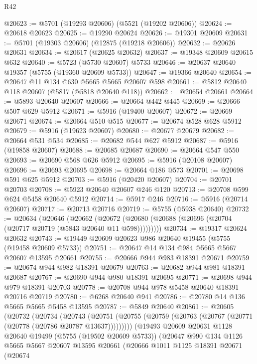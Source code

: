 \begin{lexlean}{R42}
\begin{coremodule}
@20623 := @5701 (@19293 @20606) (@5521 (@19202 @20606))
@20624 := @20618 @20623
@20625 := @19290 @20624
@20626 := @19301 @20609
@20631 := @5701 (@19303 @20606) (@12875 (@19218 @20606))
@20632 := @20626 @20631
@20634 := @20617 (@20625 @20632)
@20637 := @19348 @20609 @20615 @632
@20640 := @5723 (@5730 @20607) @5733
@20646 := @20637 @20640 @19357 (@5755 (@19360 @20609 @5733))
@20647 := @19366 @20640
@20654 := @20647 @11 @134 @630 @5665 @5665 @20607 @598
@20661 := @5812 @20640 @118 @20607 (@5817 (@5818 @20640 @118))
@20662 := @20654 @20661
@20664 := @5893 @20640 @20607
@20666 := @20664 @442 @445
@20669 := @20666 @507 @629 @5912
@20671 := @5916 (@19400 @20607)
@20672 := @20669 @20671
@20674 := @20664 @510 @515
@20677 := @20674 @528 @628 @5912
@20679 := @5916 (@19623 @20607)
@20680 := @20677 @20679
@20682 := @20664 @531 @534
@20685 := @20682 @544 @627 @5912
@20687 := @5916 (@19858 @20607)
@20688 := @20685 @20687
@20690 := @20664 @547 @550
@20693 := @20690 @568 @626 @5912
@20695 := @5916 (@20108 @20607)
@20696 := @20693 @20695
@20698 := @20664 @186 @573
@20701 := @20698 @591 @625 @5912
@20703 := @5916 (@20420 @20607)
@20704 := @20701 @20703
@20708 := @5923 @20640 @20607 @246 @120
@20713 := @20708 @599 @624 @5458 @20640 @5912
@20714 := @5917 @246
@20716 := @5916 (@20714 @20607)
@20717 := @20713 @20716
@20719 := @5755 (@5938 @20640)
@20732 := @20634
    (@20646
      (@20662 (@20672 (@20680 (@20688 (@20696 (@20704 (@20717 @20719 (@5843 @20640 @11 @598)))))))))
@20734 := @19317 @20624 @20632
@20743 := @19449 @20609 @20623 @986 @20640 @19455 (@5755 (@19458 @20609 @5733))
@20751 := @20647 @14 @134 @984 @5665 @5667 @20607 @13595 @20661
@20755 := @20666 @944 @983 @18391 @20671
@20759 := @20674 @944 @982 @18391 @20679
@20763 := @20682 @944 @981 @18391 @20687
@20767 := @20690 @944 @980 @18391 @20695
@20771 := @20698 @944 @979 @18391 @20703
@20778 := @20708 @944 @978 @5458 @20640 @18391 @20716 @20719
@20780 := @6268 @20640 @941
@20786 := @20780 @14 @136 @5665 @5665 @5458 @13595
@20787 := @5849 @20640
@20861 := @20605
    (@20732
      (@20734
        (@20743
          (@20751 (@20755 (@20759 (@20763 (@20767 (@20771 (@20778 (@20786 @20787 @13637)))))))))
        (@19493
          @20609
          @20631
          @1128
          @20640
          @19499
          (@5755 (@19502 @20609 @5733))
          (@20647
            @990
            @134
            @1126
            @5665
            @5667
            @20607
            @13595
            @20661
            (@20666
              @1011
              @1125
              @18391
              @20671
              (@20674

\end{coremodule}
\end{lexlean}

